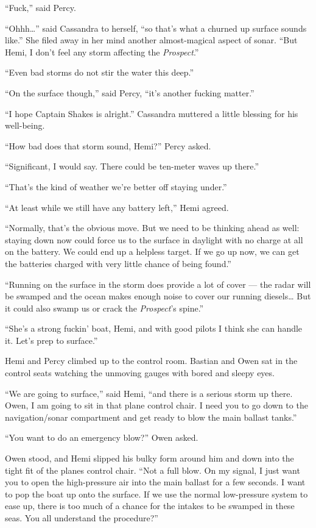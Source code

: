 \documentclass[
]{scrbook}
\begin{document}
``Fuck,'' said Percy.

``Ohhh\ldots{}'' said Cassandra to herself, ``so that's what a churned
up surface sounds like.'' She filed away in her mind another
almost-magical aspect of sonar. ``But Hemi, I don't feel any storm
affecting the \emph{Prospect}.''

``Even bad storms do not stir the water this deep.''

``On the surface though,'' said Percy, ``it's another fucking matter.''

``I hope Captain Shakes is alright.'' Cassandra muttered a little
blessing for his well-being.

``How bad does that storm sound, Hemi?'' Percy asked.

``Significant, I would say. There could be ten-meter waves up there.''

``That's the kind of weather we're better off staying under.''

``At least while we still have any battery left,'' Hemi agreed.

``Normally, that's the obvious move. But we need to be thinking ahead as
well: staying down now could force us to the surface in daylight with no
charge at all on the battery. We could end up a helpless target. If we
go up now, we can get the batteries charged with very little chance of
being found.''

``Running on the surface in the storm does provide a lot of cover ---
the radar will be swamped and the ocean makes enough noise to cover our
running diesels\ldots{} But it could also swamp us or crack the
\emph{Prospect}'s spine.''

``She's a strong fuckin' boat, Hemi, and with good pilots I think she
can handle it. Let's prep to surface.''

\bigskip

Hemi and Percy climbed up to the control room. Bastian and Owen sat in
the control seats watching the unmoving gauges with bored and sleepy
eyes.

``We are going to surface,'' said Hemi, ``and there is a serious storm
up there. Owen, I am going to sit in that plane control chair. I need
you to go down to the navigation/sonar compartment and get ready to blow
the main ballast tanks.''

``You want to do an emergency blow?'' Owen asked.

Owen stood, and Hemi slipped his bulky form around him and down into the
tight fit of the planes control chair. ``Not a full blow. On my signal,
I just want you to open the high-pressure air into the main ballast for
a few seconds. I want to pop the boat up onto the surface. If we use the
normal low-pressure system to ease up, there is too much of a chance for
the intakes to be swamped in these seas. You all understand the
procedure?''
\end{document}
